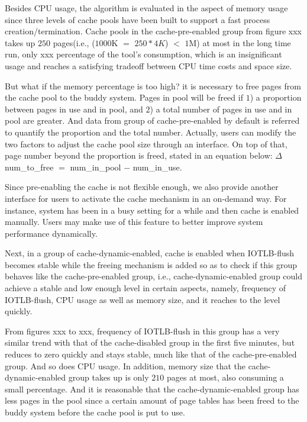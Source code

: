 \documentclass[letterpaper,twocolumn,10pt]{article}
\begin{document}
Besides CPU usage, the algorithm is evaluated in the aspect of memory usage since three levels of cache pools have been built to support a fast process creation/termination. Cache pools in the cache-pre-enabled group from figure xxx takes up $250$ pages(i.e., ($1000$K $=$ $250 * 4K$) $<$ $1$M) at most in the long time run, only xxx percentage of the tool's consumption, which is an insignificant usage and reaches a satisfying tradeoff between CPU time costs and space size.

But what if the memory percentage is too high? it is necessary to free pages from the cache pool to the buddy system. Pages in pool will be freed if $1$) a proportion between pages in use and in pool, and $2$) a total number of pages in use and in pool are greater. And data from group of cache-pre-enabled by default is referred to quantify the proportion and the total number. Actually, users can modify the two factors to adjust the cache pool size through an interface. On top of that, page number beyond the proportion is freed, stated in an equation below: $\Delta$num\_to\_free $=$ num\_in\_pool $-$ num\_in\_use.

Since pre-enabling the cache is not flexible enough, we also provide another interface for users to activate the cache mechanism in an on-demand way. For instance, system has been in a busy setting for a while and then cache is enabled manually. Users may make use of this feature to better improve system performance dynamically.

Next, in a group of cache-dynamic-enabled, cache is enabled when IOTLB-flush becomes stable while the freeing mechanism is added so as to check if this group behaves like the cache-pre-enabled group, i.e., cache-dynamic-enabled group could achieve a stable and low enough level in certain aspects, namely, frequency of IOTLB-flush, CPU usage as well as memory size, and it reaches to the level quickly.

From figures xxx to xxx, frequency of IOTLB-flush in this group has a very similar trend with that of the cache-disabled group in the first five minutes, but reduces to zero quickly and stays stable, much like that of the cache-pre-enabled group. And so does CPU usage. In addition, memory size that the cache-dynamic-enabled group takes up is only $210$ pages at most, also consuming a small percentage. And it is reasonable that the cache-dynamic-enabled group has less pages in the pool since a certain amount of page tables has been freed to the buddy system before the cache pool is put to use.
\end{document}

